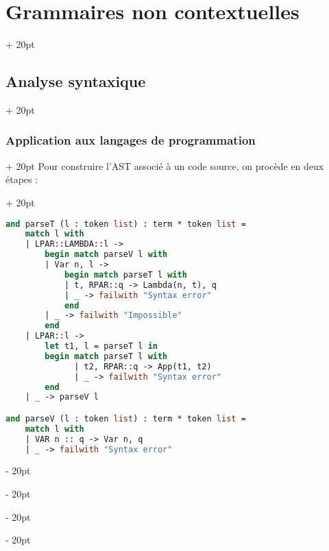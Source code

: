 \documentclass[a4paper, 12pt, twoside]{article}
\newcommand{\ind}[1][20pt]{\advance\leftskip + #1}
\newcommand{\deind}[1][20pt]{\advance\leftskip - #1}
\newenvironment{indt}[2][20pt]{#2 \par \ind[#1]}{\par \deind} %
\begin{document}
\begin{indt}{\section{Grammaires non contextuelles}}
\begin{indt}{\subsection{Analyse syntaxique}}
\begin{indt}{\subsubsection{Application aux langages de programmation}}
\begin{indt}{Pour construire l'AST associé à un code source, on procède en deux étapes :}
\begin{lstlisting}[language=Caml, xleftmargin=100pt]
and parseT (l : token list) : term * token list =
    match l with
    | LPAR::LAMBDA::l ->
        begin match parseV l with
        | Var n, l ->
            begin match parseT l with
            | t, RPAR::q -> Lambda(n, t), q
            | _ -> failwith "Syntax error"
            end
        | _ -> failwith "Impossible"
        end
    | LPAR::l ->
        let t1, l = parseT l in
        begin match parseT l with
              | t2, RPAR::q -> App(t1, t2)
              | _ -> failwith "Syntax error"
        end
    | _ -> parseV l

and parseV (l : token list) : term * token list =
    match l with
    | VAR n :: q -> Var n, q
    | _ -> failwith "Syntax error"\end{lstlisting}
                \end{indt}
            \end{indt}
        \end{indt}
    \end{indt}
    
\end{document}
